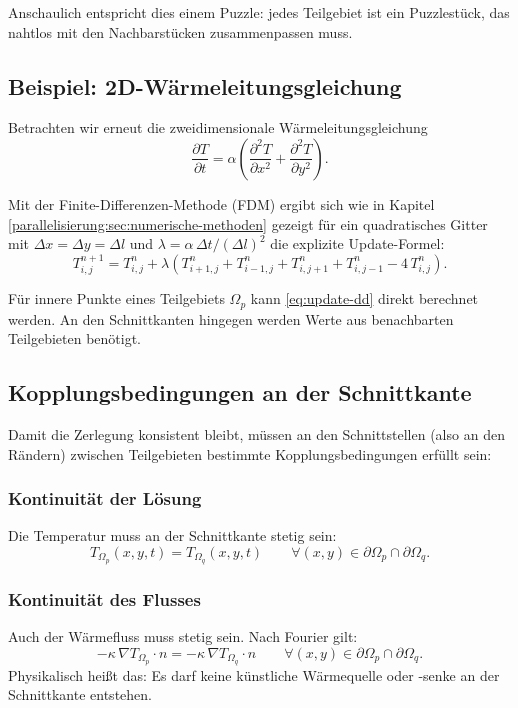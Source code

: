 Anschaulich entspricht dies einem Puzzle: 
jedes Teilgebiet ist ein Puzzlestück, das nahtlos mit den Nachbarstücken zusammenpassen muss.

\subsection{Beispiel: 2D-Wärmeleitungsgleichung}

Betrachten wir erneut die zweidimensionale Wärmeleitungsgleichung
\begin{equation}
	\frac{\partial T}{\partial t} = 
	\alpha \left(
	\frac{\partial^2 T}{\partial x^2} + \frac{\partial^2 T}{\partial y^2}
	\right).
\end{equation}

Mit der Finite-Differenzen-Methode (FDM) ergibt sich wie in Kapitel \ref{parallelisierung:sec:numerische-methoden} gezeigt für ein quadratisches Gitter mit $\Delta x=\Delta y=\Delta l$ und $\lambda=\alpha\,\Delta t/(\Delta l)^2$ die explizite Update-Formel:
\begin{equation}
	T_{i,j}^{n+1}
	=
	T_{i,j}^{n}
	+
	\lambda \left(
	T_{i+1,j}^{n}+T_{i-1,j}^{n}+T_{i,j+1}^{n}+T_{i,j-1}^{n}-4\,T_{i,j}^{n}
	\right).
	\label{eq:update-dd}
\end{equation}

Für innere Punkte eines Teilgebiets $\Omega_p$ kann \eqref{eq:update-dd} direkt berechnet werden.  
An den Schnittkanten hingegen werden Werte aus benachbarten Teilgebieten benötigt.

\subsection{Kopplungsbedingungen an der Schnittkante}

Damit die Zerlegung konsistent bleibt, müssen an den Schnittstellen (also an den Rändern) zwischen Teilgebieten bestimmte Kopplungsbedingungen erfüllt sein:

\subsubsection*{Kontinuität der Lösung}
Die Temperatur muss an der Schnittkante stetig sein:
\begin{equation}
	T_{\Omega_p}(x,y,t) = T_{\Omega_q}(x,y,t)
	\qquad \forall (x,y) \in \partial \Omega_p \cap \partial \Omega_q.
\end{equation}

\subsubsection*{Kontinuität des Flusses}
Auch der Wärmefluss muss stetig sein.  
Nach Fourier gilt:
\begin{equation}
	- \kappa \, \nabla T_{\Omega_p} \cdot n
	=
	- \kappa \, \nabla T_{\Omega_q} \cdot n
	\qquad \forall (x,y) \in \partial \Omega_p \cap \partial \Omega_q.
\end{equation}
Physikalisch heißt das: Es darf keine künstliche Wärmequelle oder -senke an der Schnittkante entstehen.

